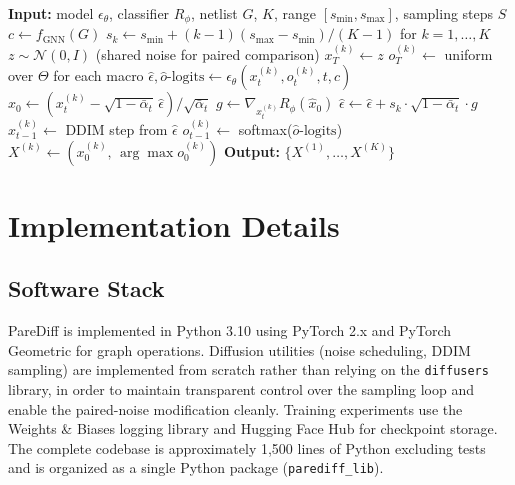 \documentclass[lettersize,journal]{IEEEtran}
\begin{document}
\begin{algorithm}[!t]
\caption{PareDiff Pareto-Front Sampling.}\label{alg:pareto}
\begin{algorithmic}
\STATE \textbf{Input:} model $\epsilon_\theta$, classifier $R_\phi$, netlist $G$, $K$, range $[s_\text{min}, s_\text{max}]$, sampling steps $S$
\STATE $c \gets f_\text{GNN}(G)$
\STATE $s_k \gets s_\text{min} + (k-1)(s_\text{max} - s_\text{min})/(K-1)$ for $k = 1, \dots, K$
\STATE $z \sim \mathcal{N}(0, I)$ (shared noise for paired comparison)
    \STATE $x_T^{(k)} \gets z$
    \STATE $o_T^{(k)} \gets$ uniform over $\Theta$ for each macro
        \STATE $\hat\epsilon, \hat{o}\text{-logits} \gets \epsilon_\theta(x_t^{(k)}, o_t^{(k)}, t, c)$
        \STATE $\hat{x}_0 \gets (x_t^{(k)} - \sqrt{1 - \bar{\alpha}_t}\,\hat\epsilon) / \sqrt{\bar{\alpha}_t}$
        \STATE $g \gets \nabla_{x_t^{(k)}} R_\phi(\hat{x}_0)$
        \STATE $\hat\epsilon \gets \hat\epsilon + s_k \cdot \sqrt{1 - \bar{\alpha}_t} \cdot g$
        \STATE $x_{t-1}^{(k)} \gets$ DDIM step from $\hat\epsilon$
        \STATE $o_{t-1}^{(k)} \gets$ softmax($\hat{o}\text{-logits}$)
    \ENDFOR
    \STATE $X^{(k)} \gets (x_0^{(k)},\, \arg\max o_0^{(k)})$
\ENDFOR
\STATE \textbf{Output:} $\{X^{(1)}, \dots, X^{(K)}\}$
\end{algorithmic}
\end{algorithm}

\section{Implementation Details}
\label{sec:implementation}

\subsection{Software Stack}

PareDiff is implemented in Python 3.10 using PyTorch 2.x and PyTorch Geometric for graph operations. Diffusion utilities (noise scheduling, DDIM sampling) are implemented from scratch rather than relying on the \texttt{diffusers} library, in order to maintain transparent control over the sampling loop and enable the paired-noise modification cleanly. Training experiments use the Weights \& Biases logging library and Hugging Face Hub for checkpoint storage. The complete codebase is approximately 1{,}500 lines of Python excluding tests and is organized as a single Python package (\texttt{parediff\_lib}).
\end{document}
